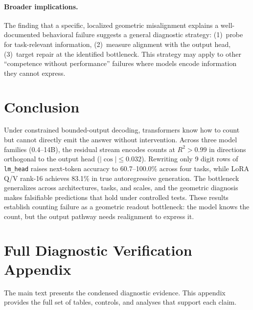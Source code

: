 \documentclass{article}
\begin{document}
\paragraph{Broader implications.}
The finding that a specific, localized geometric misalignment explains a
well-documented behavioral failure suggests a general diagnostic strategy:
(1)~probe for task-relevant information, (2)~measure alignment with the output
head, (3)~target repair at the identified bottleneck. This strategy may apply
to other ``competence without performance'' failures where models encode
information they cannot express.

\section{Conclusion}

Under constrained bounded-output decoding, transformers know how to count but
cannot directly emit the answer without intervention. Across three model
families (0.4--14B), the residual stream encodes counts at $R^2>0.99$ in
directions orthogonal to the output head ($|\cos| \leq 0.032$). Rewriting only
9 digit rows of \texttt{lm\_head} raises next-token accuracy to 60.7--100.0\%
across four tasks, while LoRA Q/V rank-16 achieves 83.1\% in true
autoregressive generation. The bottleneck generalizes across architectures,
tasks, and scales, and the geometric diagnosis makes falsifiable predictions
that hold under controlled tests. These results establish counting failure as a
geometric readout bottleneck: the model knows the count, but the output pathway
needs realignment to express it.




\appendix

\section{Full Diagnostic Verification Appendix}
\label{sec:appendix_dps}

The main text presents the condensed diagnostic evidence. This appendix provides
the full set of tables, controls, and analyses that support each claim.
\end{document}
